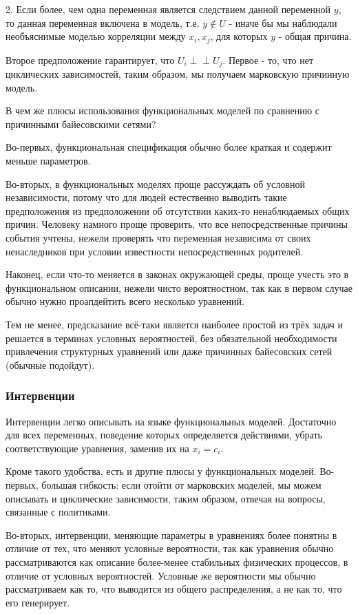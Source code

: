 \documentclass[fleqn]{article}
\newcommand{\independent}{\perp \!\!\! \perp}
\begin{document}
2. Если более, чем одна переменная является следствием данной переменной $y$, то данная переменная включена в модель, т.е. $y \notin U$ - иначе бы мы наблюдали необъяснимые моделью корреляции между $x_i, x_j$, для которых $y$ - общая причина.

Второе предположение гарантирует, что $U_i \independent U_j$. Первое - то, что нет циклических зависимостей, таким образом, мы получаем марковскую причинную модель.

В чем же плюсы использования функциональных моделей по сравнению с причинными байесовскими сетями?  

Во-первых, функциональная спецификация обычно более краткая и содержит меньше параметров.

Во-вторых, в функциональных моделях проще рассуждать об условной независимости, потому что для людей естественно выводить такие предположения из предположении об отсутствии каких-то ненаблюдаемых общих причин. Человеку намного проще проверить, что все непосредственные причины события учтены, нежели проверять что переменная независима от своих ненаследников при условии известности непосредственных родителей.

Наконец, если что-то меняется в законах окружающей среды, проще учесть это в функциональном описании, нежели чисто вероятностном, так как в первом случае обычно нужно проапдейтить всего несколько уравнений.

Тем не менее, предсказание всё-таки является наиболее простой из трёх задач и решается в терминах условных вероятностей, без обязательной необходимости привлечения структурных уравнений или даже причинных байесовских сетей (обычные подойдут).

\subsubsection*{Интервенции}

Интервенции легко описывать на языке функциональных моделей. Достаточно для всех переменных, поведение которых определяется действиями, убрать соответствующие уравнения, заменив их на $x_i = c_i$. 

Кроме такого удобства, есть и другие плюсы у функциональных моделей. Во-первых, большая гибкость: если отойти от марковских моделей, мы можем описывать и циклические зависимости, таким образом, отвечая на вопросы, связанные с политиками.

Во-вторых, интервенции, меняющие параметры в уравнениях более понятны в отличие от тех, что меняют условные вероятности, так как уравнения обычно рассматриваются как описание более-менее стабильных физических процессов, в отличие от условных вероятностей. Условные же вероятности мы обычно рассматриваем как то, что выводится из общего распределения, а не как то, что его генерирует. 
\end{document}
